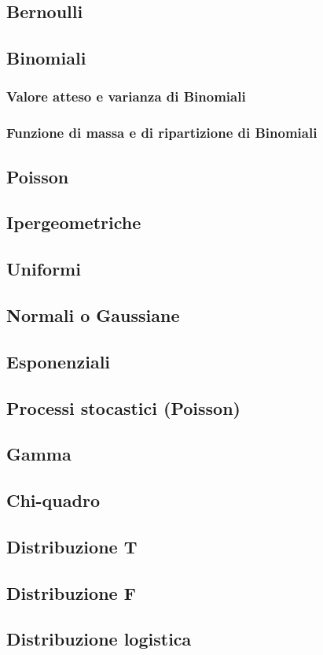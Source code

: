 \documentclass[]{article}
\begin{document}
    \subsection{Bernoulli}

    \subsection{Binomiali}
    \subsubsection{Valore atteso e varianza di Binomiali}
    \subsubsection{Funzione di massa e di ripartizione di Binomiali}

    \subsection{Poisson}

    \subsection{Ipergeometriche}

    \subsection{Uniformi}

    \subsection{Normali o Gaussiane}

    \subsection{Esponenziali}

    \subsection{Processi stocastici (Poisson)}

    \subsection{Gamma}

    \subsection{Chi-quadro}

    \subsection{Distribuzione T}

    \subsection{Distribuzione F}

    \subsection{Distribuzione logistica}
\end{document}
